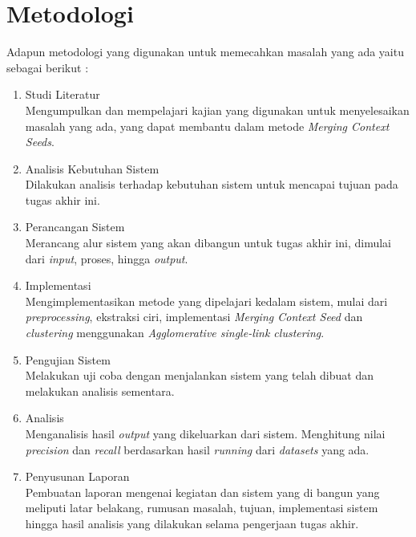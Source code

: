 \documentclass[../Book, Implementasi Algoritma Merging Context Seeds untuk Plagiarism Detection.tex]{subfiles}
\begin{document}
	\section{Metodologi}
	\noindent Adapun metodologi yang digunakan untuk memecahkan masalah yang ada yaitu sebagai berikut :
	\begin{enumerate}
		\item Studi Literatur\\
		Mengumpulkan dan mempelajari kajian yang digunakan untuk menyelesaikan masalah yang ada, yang dapat membantu dalam metode \textit{Merging Context Seeds}.
		
		\item Analisis Kebutuhan Sistem\\
		Dilakukan analisis terhadap kebutuhan sistem untuk mencapai tujuan pada tugas akhir ini.
		
		\item Perancangan Sistem\\
		Merancang alur sistem yang akan dibangun untuk tugas akhir ini, dimulai dari \textit{input}, proses, hingga \textit{output}.
		
		\item Implementasi\\
		Mengimplementasikan metode yang dipelajari kedalam sistem, mulai dari \textit{preprocessing}, ekstraksi ciri, implementasi \textit{Merging Context Seed} dan \textit{clustering} menggunakan \textit{Agglomerative single-link clustering}.
		
		\item Pengujian Sistem\\
		Melakukan uji coba dengan menjalankan sistem yang telah dibuat dan melakukan analisis sementara.
		
		\item Analisis\\
		Menganalisis hasil \textit{output} yang dikeluarkan dari sistem. Menghitung nilai \textit{precision} dan \textit{recall} berdasarkan hasil \textit{running} dari \textit{datasets} yang ada.
		
		\item Penyusunan Laporan\\
		Pembuatan laporan mengenai kegiatan dan sistem yang di bangun yang meliputi latar belakang, rumusan masalah, tujuan, implementasi sistem hingga hasil analisis yang dilakukan selama pengerjaan tugas akhir.
	\end{enumerate}
\end{document}
